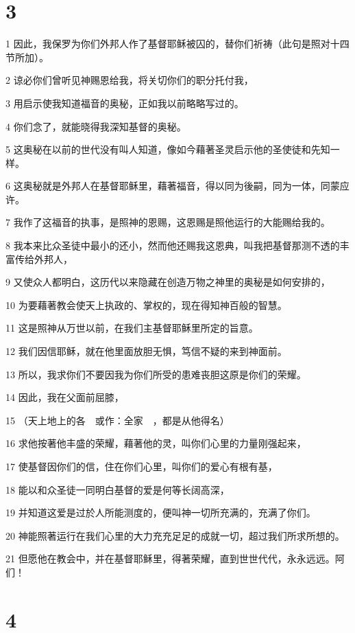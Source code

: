 \chapter{3}

\par 1 因此，我保罗为你们外邦人作了基督耶稣被囚的，替你们祈祷（此句是照对十四节所加）。
\par 2 谅必你们曾听见神赐恩给我，将关切你们的职分托付我，
\par 3 用启示使我知道福音的奥秘，正如我以前略略写过的。
\par 4 你们念了，就能晓得我深知基督的奥秘。
\par 5 这奥秘在以前的世代没有叫人知道，像如今藉著圣灵启示他的圣使徒和先知一样。
\par 6 这奥秘就是外邦人在基督耶稣里，藉著福音，得以同为後嗣，同为一体，同蒙应许。
\par 7 我作了这福音的执事，是照神的恩赐，这恩赐是照他运行的大能赐给我的。
\par 8 我本来比众圣徒中最小的还小，然而他还赐我这恩典，叫我把基督那测不透的丰富传给外邦人，
\par 9 又使众人都明白，这历代以来隐藏在创造万物之神里的奥秘是如何安排的，
\par 10 为要藉著教会使天上执政的、掌权的，现在得知神百般的智慧。
\par 11 这是照神从万世以前，在我们主基督耶稣里所定的旨意。
\par 12 我们因信耶稣，就在他里面放胆无惧，笃信不疑的来到神面前。
\par 13 所以，我求你们不要因我为你们所受的患难丧胆这原是你们的荣耀。
\par 14 因此，我在父面前屈膝，
\par 15 （天上地上的各　或作：全家　，都是从他得名）
\par 16 求他按著他丰盛的荣耀，藉著他的灵，叫你们心里的力量刚强起来，
\par 17 使基督因你们的信，住在你们心里，叫你们的爱心有根有基，
\par 18 能以和众圣徒一同明白基督的爱是何等长阔高深，
\par 19 并知道这爱是过於人所能测度的，便叫神一切所充满的，充满了你们。
\par 20 神能照著运行在我们心里的大力充充足足的成就一切，超过我们所求所想的。
\par 21 但愿他在教会中，并在基督耶稣里，得著荣耀，直到世世代代，永永远远。阿们！

\chapter{4}

